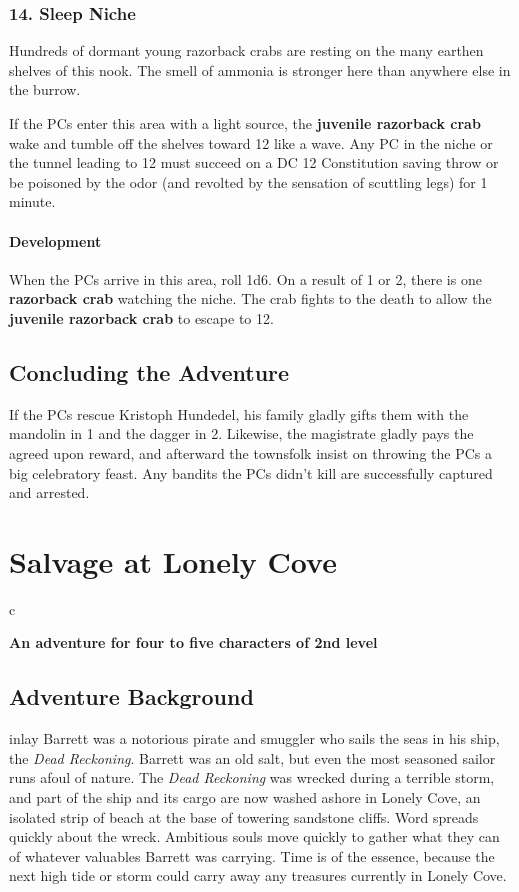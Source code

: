 \documentclass[10pt,a4paper,twoside,bg=print,twocolumn,openany,nodeprecatedcode]{dndbook}
\begin{document}
\subsection{14. Sleep Niche}
\begin{DndReadAloud}{}
Hundreds of dormant young razorback crabs are resting on the many earthen shelves of this nook. The smell of ammonia is stronger here than anywhere else in the burrow.

\end{DndReadAloud}

If the PCs enter this area with a light source, the \textbf{juvenile razorback crab} wake and tumble off the shelves toward 12 like a wave. Any PC in the niche or the tunnel leading to 12 must succeed on a DC 12 Constitution saving throw or be poisoned by the odor (and revolted by the sensation of scuttling legs) for 1 minute.

\subsubsection{Development}
When the PCs arrive in this area, roll 1d6. On a result of 1 or 2, there is one \textbf{razorback crab} watching the niche. The crab fights to the death to allow the \textbf{juvenile razorback crab} to escape to 12.

\section{Concluding the Adventure}
If the PCs rescue Kristoph Hundedel, his family gladly gifts them with the mandolin in 1 and the dagger in 2. Likewise, the magistrate gladly pays the agreed upon reward, and afterward the townsfolk insist on throwing the PCs a big celebratory feast. Any bandits the PCs didn't kill are successfully captured and arrested.

\chapter{Salvage at Lonely Cove}

\begin{DndTable}{c}

\textbf{An adventure for four to five characters of 2nd level}\\
\end{DndTable}

\section{Adventure Background}
inlay Barrett was a notorious pirate and smuggler who sails the seas in his ship, the \textit{Dead Reckoning}. Barrett was an old salt, but even the most seasoned sailor runs afoul of nature. The \textit{Dead Reckoning} was wrecked during a terrible storm, and part of the ship and its cargo are now washed ashore in Lonely Cove, an isolated strip of beach at the base of towering sandstone cliffs. Word spreads quickly about the wreck. Ambitious souls move quickly to gather what they can of whatever valuables Barrett was carrying. Time is of the essence, because the next high tide or storm could carry away any treasures currently in Lonely Cove.
\end{document}
